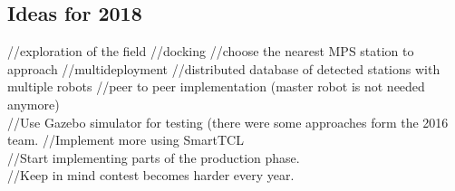 \subsection{Ideas for 2018}

//exploration of the field
//docking 
//choose the nearest MPS station to approach
//multideployment 
//distributed database of detected stations with multiple robots
//peer to peer implementation (master robot is not needed anymore) \\

//Use Gazebo simulator for testing (there were some approaches 
form the 2016 team. 
//Implement more using SmartTCL \\

//Start implementing parts of the production phase. \\

//Keep in mind contest becomes harder every year. 